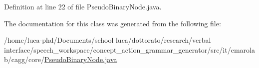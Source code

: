 Definition at line 22 of file Pseudo\-Binary\-Node.\-java.



The documentation for this class was generated from the following file\-:\begin{DoxyCompactItemize}
\item 
/home/luca-\/phd/\-Documents/school luca/dottorato/research/verbal interface/speech\-\_\-workspace/concept\-\_\-action\-\_\-grammar\-\_\-generator/src/it/emarolab/cagg/core/\hyperlink{PseudoBinaryNode_8java}{Pseudo\-Binary\-Node.\-java}\end{DoxyCompactItemize}
